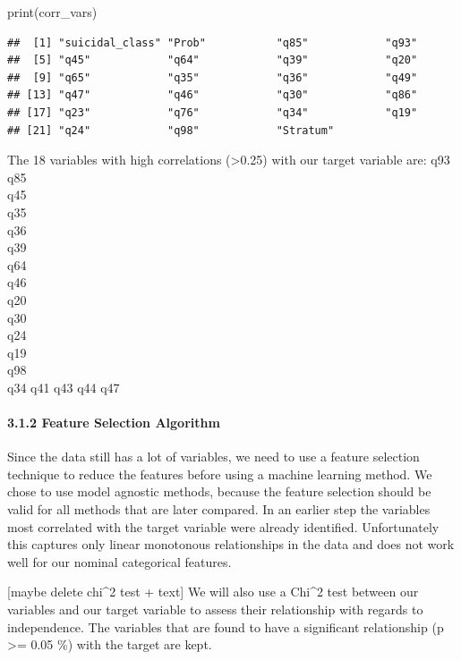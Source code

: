 \documentclass[
]{article}
\newenvironment{Shaded}{\begin{snugshade}}{\end{snugshade}}
\newcommand{\FunctionTok}[1]{\textcolor[rgb]{0.00,0.00,0.00}{#1}}
\newcommand{\NormalTok}[1]{#1}
\begin{document}
\begin{Shaded}
\begin{Highlighting}[]
\FunctionTok{print}\NormalTok{(corr\_vars)}
\end{Highlighting}
\end{Shaded}

\begin{verbatim}
##  [1] "suicidal_class" "Prob"           "q85"            "q93"           
##  [5] "q45"            "q64"            "q39"            "q20"           
##  [9] "q65"            "q35"            "q36"            "q49"           
## [13] "q47"            "q46"            "q30"            "q86"           
## [17] "q23"            "q76"            "q34"            "q19"           
## [21] "q24"            "q98"            "Stratum"
\end{verbatim}

The 18 variables with high correlations (\textgreater0.25) with our
target variable are: q93\\
q85\\
q45\\
q35\\
q36\\
q39\\
q64\\
q46\\
q20\\
q30\\
q24\\
q19\\
q98\\
q34 q41 q43 q44 q47

\hypertarget{feature-selection-algorithm}{%
\paragraph{3.1.2 Feature Selection
Algorithm}\label{feature-selection-algorithm}}

Since the data still has a lot of variables, we need to use a feature
selection technique to reduce the features before using a machine
learning method. We chose to use model agnostic methods, because the
feature selection should be valid for all methods that are later
compared. In an earlier step the variables most correlated with the
target variable were already identified. Unfortunately this captures
only linear monotonous relationships in the data and does not work well
for our nominal categorical features.

{[}maybe delete chi\^{}2 test + text{]} We will also use a Chi\^{}2 test
between our variables and our target variable to assess their
relationship with regards to independence. The variables that are found
to have a significant relationship (p \textgreater= 0.05 \%) with the
target are kept.
\end{document}
